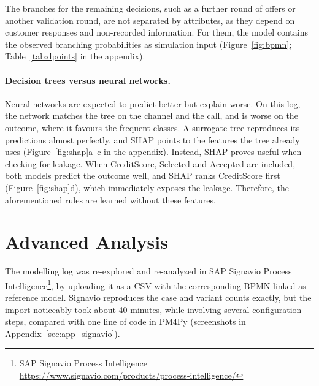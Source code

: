 \documentclass[
  english,        %
  font=times,     %
  twocolumn,      %
]{tumarticle}
\begin{document}
The branches for the remaining decisions, such as a further round of offers or another validation round, are not separated by attributes, as they depend on customer responses and non-recorded information. For them, the model contains the observed branching probabilities as simulation input (Figure~\ref{fig:bpmn}; Table~\ref{tab:dpoints} in the appendix).

\paragraph{Decision trees versus neural networks.}
Neural networks are expected to predict better but explain worse. On this log, the network matches the tree on the channel and the call, and is worse on the outcome, where it favours the frequent classes. A surrogate tree reproduces its predictions almost perfectly, and SHAP points to the features the tree already uses (Figure~\ref{fig:shap}a--c in the appendix). Instead, SHAP proves useful when checking for leakage. When CreditScore, Selected and Accepted are included, both models predict the outcome well, and SHAP ranks CreditScore first (Figure~\ref{fig:shap}d), which immediately exposes the leakage. Therefore, the aforementioned rules are learned without these features. 

\section{Advanced Analysis}\label{sec:advanced}
The modelling log was re-explored and re-analyzed in SAP Signavio Process Intelligence\footnote{SAP Signavio Process Intelligence \url{https://www.signavio.com/products/process-intelligence/}}, by uploading it as a CSV with the corresponding BPMN linked as reference model. Signavio reproduces the case and variant counts exactly, but the import noticeably took about 40 minutes, while involving several configuration steps, compared with one line of code in PM4Py (screenshots in Appendix~\ref{sec:app_signavio}).
\end{document}

